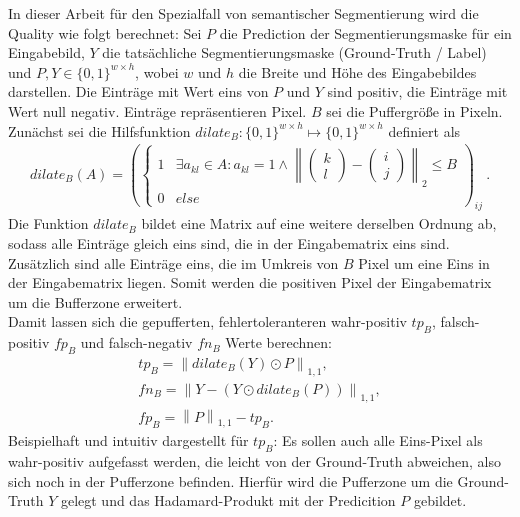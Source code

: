 In dieser Arbeit für den Spezialfall von semantischer Segmentierung wird die Quality wie folgt berechnet: 
Sei $P$ die Prediction der Segmentierungsmaske für ein Eingabebild, $Y$ die tatsächliche Segmentierungsmaske (Ground-Truth / Label)
und $P, Y \in \{0, 1\}^{w \times h}$, wobei $w$ und $h$ die Breite und Höhe des Eingabebildes darstellen.
Die Einträge mit Wert eins von $P$ und $Y$ sind positiv, die Einträge mit Wert null negativ. Einträge repräsentieren Pixel.
$B$ sei die Puffergröße in Pixeln. \\
Zunächst sei die Hilfsfunktion $dilate_B: \{0,1\}^{w \times h} \mapsto \{0,1\}^{w \times h}$ definiert als 
\newcommand{\norm}[1]{\left\lVert#1\right\rVert}
\begin{align}
	\label{eq:dilate} dilate_B(A) = \left( \begin{cases} 
		1 & \exists a_{kl} \in A: a_{kl} = 1 \land \norm{
			\begin{pmatrix} k \\ l \end{pmatrix} - \begin{pmatrix} i \\ j \end{pmatrix} }_2 \leq B \\
		0 & else 
	\end{cases} \right)_{ij}~.
\end{align}
Die Funktion $dilate_B$ bildet eine Matrix auf eine weitere derselben Ordnung ab, 
sodass alle Einträge gleich eins sind, die in der Eingabematrix eins sind. Zusätzlich sind alle Einträge eins, 
die im Umkreis von $B$ Pixel um eine Eins in der Eingabematrix liegen. Somit werden die positiven 
Pixel der Eingabematrix um die Bufferzone erweitert.  \\
Damit lassen sich die gepufferten, fehlertoleranteren wahr-positiv $tp_B$, falsch-positiv $fp_B$ und 
falsch-negativ $fn_B$ Werte berechnen: 
\begin{align}
	\label{eq:buffering} {tp}_B = \norm{dilate_{B}(Y) \odot P}_{1,1} , \\
	fn_B = \norm{Y - (Y \odot dilate_{B}(P))}_{1,1} , \\
	{fp}_B = \norm{P}_{1,1} - {tp}_B .
\end{align}
Beispielhaft und intuitiv dargestellt für $tp_B$: Es sollen auch alle Eins-Pixel als wahr-positiv aufgefasst werden,
die leicht von der Ground-Truth abweichen, also sich noch in der Pufferzone befinden. 
Hierfür wird die Pufferzone um die Ground-Truth $Y$ gelegt und das Hadamard-Produkt mit der Predicition $P$ gebildet.
